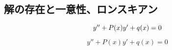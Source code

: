 \documentclass[uplatex]{jsarticle}
\begin{document}
\setcounter{section}{1}
\setcounter{subsection}{5}
\subsection{解の存在と一意性、ロンスキアン}
\begin{ceqn}
\begin{equation}
$$ y'' +P(x)y' + q(x) = 0 $$
\end{equation}

\end{ceqn}
$$ y'' +P(x)y' + q(x) = 0 $$
\end{document}
